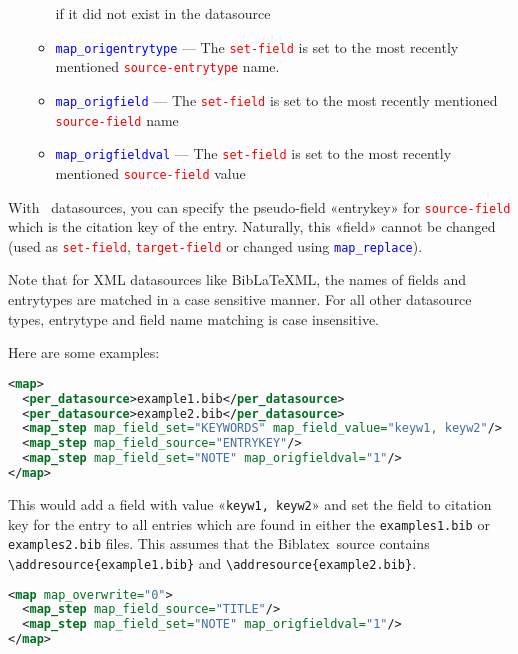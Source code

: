 \documentclass{ltxdockit}
\newcommand*{\biblatex}{Biblatex\xspace}
\begin{document}
\begin{itemize}
\begin{itemize}
      if it did not exist in the datasource
    \item \textcolor{blue}{\texttt{map\_origentrytype}} --- The
      \textcolor{red}{\texttt{set-field}} is set to the
      most recently mentioned \textcolor{red}{\texttt{source-entrytype}} name.
    \item \textcolor{blue}{\texttt{map\_origfield}} --- The
      \textcolor{red}{\texttt{set-field}} is set to the most recently
      mentioned \textcolor{red}{\texttt{source-field}} name
    \item \textcolor{blue}{\texttt{map\_origfieldval}} --- The
      \textcolor{red}{\texttt{set-field}} is set to the most recently
      mentioned \textcolor{red}{\texttt{source-field}} value
  \end{itemize}
\end{itemize}

\noindent With \bibtex\ datasources, you can specify the
pseudo-field «entrykey» for \textcolor{red}{\texttt{source-field}}
which is the citation key of the entry. Naturally, this «field» cannot
be changed (used as \textcolor{red}{\texttt{set-field}},
\textcolor{red}{\texttt{target-field}} or changed using
\textcolor{blue}{\texttt{map\_replace}}).

Note that for XML datasources like BibLaTeXML, the names of
fields and entrytypes are matched in a case sensitive manner. For all other
datasource types, entrytype and field name matching is
case insensitive.

\noindent Here are some examples:

\begin{lstlisting}[language=xml,escapechar=+,mathescape=true]
<map>
  <per_datasource>example1.bib</per_datasource>
  <per_datasource>example2.bib</per_datasource>
  <map_step map_field_set="KEYWORDS" map_field_value="keyw1, keyw2"/>
  <map_step map_field_source="ENTRYKEY"/>
  <map_step map_field_set="NOTE" map_origfieldval="1"/>
</map>
\end{lstlisting}

\noindent This would add a  field with value «\verb+keyw1, keyw2+»
and set the  field to citation key for the entry
to all entries which are found in either the
\verb+examples1.bib+ or \verb+examples2.bib+ files. This assumes that the
\biblatex\ source contains \verb+\addresource{example1.bib}+ and
\verb+\addresource{example2.bib}+.

\begin{lstlisting}[language=xml,escapechar=+,mathescape=true]
<map map_overwrite="0">
  <map_step map_field_source="TITLE"/>
  <map_step map_field_set="NOTE" map_origfieldval="1"/>
</map>
\end{lstlisting}
\end{document}

